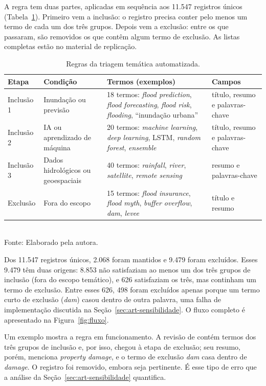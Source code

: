 A regra tem duas partes, aplicadas em sequência aos 11.547 registros únicos (Tabela~\ref{tab:regra}). Primeiro vem a inclusão: o registro precisa conter pelo menos um termo de cada um dos três grupos. Depois vem a exclusão: entre os que passaram, são removidos os que contêm algum termo de exclusão. As listas completas estão no material de replicação.

\begin{table}[!htb]
\centering
\caption{Regras da triagem temática automatizada.}
\label{tab:regra}
{\small
\renewcommand{\arraystretch}{1.2}
\begin{tabular}{@{}p{1.9cm}p{3.2cm}p{5.4cm}p{2.6cm}@{}}
\toprule
\textbf{Etapa} & \textbf{Condição} & \textbf{Termos (exemplos)} & \textbf{Campos}\\
\midrule
Inclusão 1 & Inundação ou previsão & 18 termos: \textit{flood prediction}, \textit{flood forecasting}, \textit{flood risk}, \textit{flooding}, ``inundação urbana'' & título, resumo e palavras-chave\\
Inclusão 2 & IA ou aprendizado de máquina & 20 termos: \textit{machine learning}, \textit{deep learning}, LSTM, \textit{random forest}, \textit{ensemble} & título, resumo e palavras-chave\\
Inclusão 3 & Dados hidrológicos ou geoespaciais & 40 termos: \textit{rainfall}, \textit{river}, \textit{satellite}, \textit{remote sensing} & resumo e palavras-chave\\
Exclusão & Fora do escopo & 15 termos: \textit{flood insurance}, \textit{flood myth}, \textit{buffer overflow}, \textit{dam}, \textit{levee} & título e resumo\\
\bottomrule
\end{tabular}}\\[2mm]
{\small Fonte: Elaborado pela autora.}
\end{table}

Dos 11.547 registros únicos, 2.068 foram mantidos e 9.479 foram excluídos. Esses 9.479 têm duas origens: 8.853 não satisfaziam ao menos um dos três grupos de inclusão (fora do escopo temático), e 626 satisfaziam os três, mas continham um termo de exclusão. Entre esses 626, 498 foram excluídos apenas porque um termo curto de exclusão (\textit{dam}) casou dentro de outra palavra, uma falha de implementação discutida na Seção~\ref{sec:art-sensibilidade}. O fluxo completo é apresentado na Figura~\ref{fig:fluxo}.

Um exemplo mostra a regra em funcionamento. A revisão de  contém termos dos três grupos de inclusão e, por isso, chegou à etapa de exclusão; seu resumo, porém, menciona \textit{property damage}, e o termo de exclusão \textit{dam} casa dentro de \textit{damage}. O registro foi removido, embora seja pertinente. É esse tipo de erro que a análise da Seção~\ref{sec:art-sensibilidade} quantifica.

